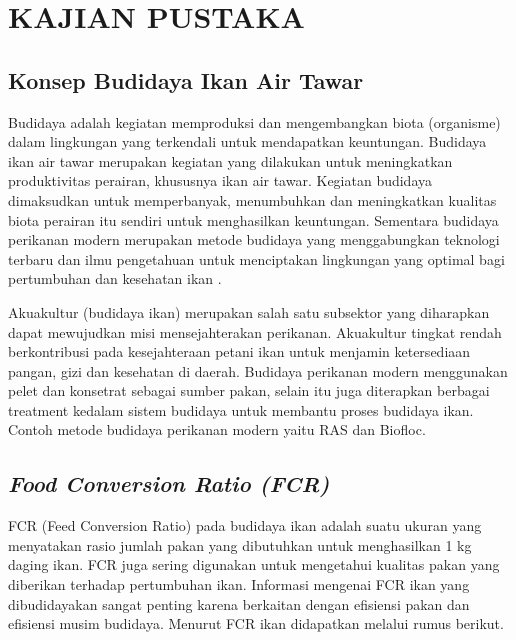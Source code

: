 
\chapter{KAJIAN PUSTAKA} 

\section{Konsep Budidaya Ikan Air Tawar}

Budidaya adalah kegiatan  memproduksi dan mengembangkan biota (organisme) dalam lingkungan yang terkendali untuk mendapatkan keuntungan. Budidaya ikan air tawar merupakan kegiatan yang dilakukan untuk meningkatkan produktivitas perairan,  khususnya ikan air tawar. Kegiatan budidaya dimaksudkan untuk memperbanyak, menumbuhkan dan meningkatkan kualitas biota perairan itu sendiri untuk menghasilkan keuntungan. Sementara budidaya perikanan modern merupakan metode budidaya yang menggabungkan teknologi terbaru dan ilmu pengetahuan untuk menciptakan lingkungan yang optimal bagi pertumbuhan dan kesehatan ikan \citep{bangkit2016}.

Akuakultur (budidaya ikan) merupakan salah satu subsektor yang diharapkan dapat mewujudkan misi mensejahterakan perikanan. Akuakultur tingkat rendah berkontribusi pada kesejahteraan petani ikan untuk menjamin ketersediaan pangan, gizi dan kesehatan di daerah. Budidaya perikanan modern menggunakan pelet dan konsetrat sebagai sumber pakan, selain itu juga diterapkan berbagai treatment kedalam sistem budidaya untuk membantu proses budidaya ikan. Contoh metode budidaya perikanan modern yaitu RAS dan Biofloc.  


\section{\textit{Food Conversion Ratio (FCR)}}
FCR (Feed Conversion Ratio) pada budidaya ikan adalah suatu ukuran yang menyatakan rasio jumlah pakan yang dibutuhkan untuk menghasilkan 1 kg daging ikan. FCR juga sering digunakan untuk mengetahui kualitas pakan yang diberikan terhadap pertumbuhan ikan. Informasi mengenai FCR ikan yang dibudidayakan sangat penting karena berkaitan dengan efisiensi pakan dan efisiensi musim budidaya. Menurut \citep{effendie1997} FCR ikan didapatkan melalui rumus berikut.

